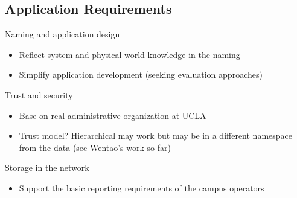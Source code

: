 \subsection{Application Requirements}



Naming and application design
\begin{itemize}
\item Reflect system and physical world knowledge in the naming 
\item Simplify application development (seeking evaluation approaches)
\end{itemize}

Trust and security
\begin{itemize}
\item Base on real administrative organization at UCLA
\item Trust model? Hierarchical may work but may be in a different namespace from the data  (see Wentao’s work so far) 
\end{itemize}

Storage in the network
\begin{itemize}
\item Support the basic reporting requirements of the campus operators
\end{itemize}
